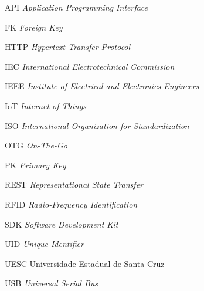 \begin{siglas}

\item[API] \textit{Application Programming Interface}
\item[FK] \textit{Foreign Key}
\item[HTTP] \textit{Hypertext Transfer Protocol}
\item[IEC] \textit{International Electrotechnical Commission}
\item[IEEE] \textit{Institute of Electrical and Electronics Engineers}
\item[IoT] \textit{Internet of Things}
\item[ISO] \textit{International Organization for Standardization}
\item[OTG] \textit{On-The-Go}
\item[PK] \textit{Primary Key}
\item[REST] \textit{Representational State Transfer}
\item[RFID] \textit{Radio-Frequency Identification}
\item[SDK] \textit{Software Development Kit}
\item[UID] \textit{Unique Identifier}
\item[UESC] Universidade Estadual de Santa Cruz
\item[USB] \textit{Universal Serial Bus}

\end{siglas}
